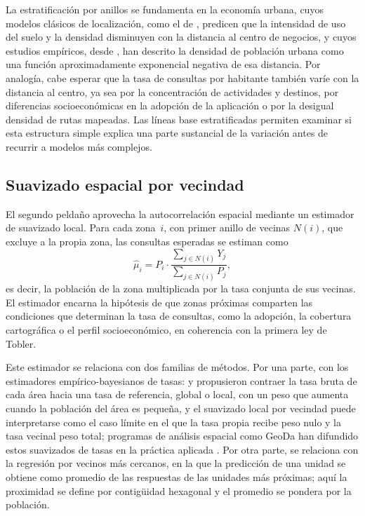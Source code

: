 La estratificación por anillos se fundamenta en la economía urbana, cuyos modelos clásicos
de localización, como el de \textcite{alonso1964}, predicen que la intensidad de uso del
suelo y la densidad disminuyen con la distancia al centro de negocios, y cuyos estudios
empíricos, desde \textcite{clark1951}, han descrito la densidad de población urbana como una
función aproximadamente exponencial negativa de esa distancia. Por analogía, cabe esperar
que la tasa de consultas por habitante también varíe con la distancia al centro, ya sea por
la concentración de actividades y destinos, por diferencias socioeconómicas en la adopción
de la aplicación o por la desigual densidad de rutas mapeadas. Las líneas base
estratificadas permiten examinar si esta estructura simple explica una parte sustancial de
la variación antes de recurrir a modelos más complejos.

\subsection{Suavizado espacial por vecindad}
\label{subsec:suavizado-vecindad}

El segundo peldaño aprovecha la autocorrelación espacial mediante un estimador de suavizado
local. Para cada zona~$i$, con primer anillo de vecinas $N(i)$, que excluye a la propia
zona, las consultas esperadas se estiman como
\[
  \hat{\mu}_i = P_i \cdot \frac{\sum_{j \in N(i)} Y_j}{\sum_{j \in N(i)} P_j},
\]
es decir, la población de la zona multiplicada por la tasa conjunta de sus vecinas. El
estimador encarna la hipótesis de que zonas próximas comparten las condiciones que
determinan la tasa de consultas, como la adopción, la cobertura cartográfica o el perfil
socioeconómico, en coherencia con la primera ley de Tobler.

Este estimador se relaciona con dos familias de métodos. Por una parte, con los estimadores
empírico-bayesianos de tasas: \textcite{clayton1987} y \textcite{marshall1991} propusieron
contraer la tasa bruta de cada área hacia una tasa de referencia, global o local, con un
peso que aumenta cuando la población del área es pequeña, y el suavizado local por vecindad
puede interpretarse como el caso límite en el que la tasa propia recibe peso nulo y la tasa
vecinal peso total; programas de análisis espacial como GeoDa han difundido estos suavizados
de tasas en la práctica aplicada \parencite{anselin2006}. Por otra parte, se relaciona con
la regresión por vecinos más cercanos, en la que la predicción de una unidad se obtiene como
promedio de las respuestas de las unidades más próximas; aquí la proximidad se define por
contigüidad hexagonal y el promedio se pondera por la población.

